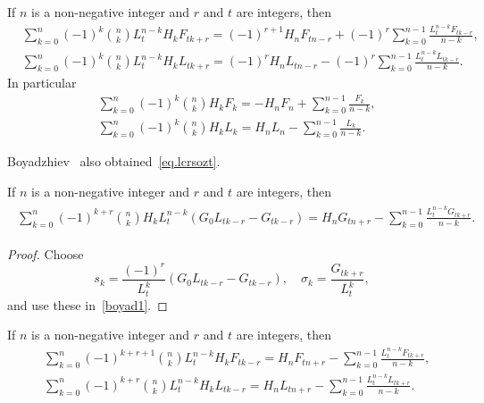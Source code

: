 \documentclass[12pt,reqno]{article}
\begin{document}
\begin{corollary}
If $n$ is a non-negative integer and $r$ and $t$ are integers, then
\begin{align}
&\sum_{k = 0}^n ( - 1)^k \binom{{n}}{k}L_t^{n - k} H_k F_{tk + r} = ( - 1)^{r + 1} H_n F_{tn - r} + ( - 1)^r \sum_{k = 0}^{n - 1} {\frac{{L_t^{n - k} F_{tk - r} }}{{n - k}}} ,\\
&\sum_{k = 0}^n ( - 1)^k \binom{{n}}{k}L_t^{n - k} H_k L_{tk + r} = ( - 1)^r H_n L_{tn - r} - ( - 1)^r \sum_{k = 0}^{n - 1} {\frac{{L_t^{n - k} L_{tk - r} }}{{n - k}}}.
\end{align}
In particular
\begin{align}
&\sum_{k = 0}^n ( - 1)^k \binom{{n}}{k}H_k F_k = - H_n F_n + \sum_{k = 0}^{n - 1} {\frac{{F_k }}{{n - k}}}\label{eq.lcrsozt},\\ 
&\sum_{k = 0}^n ( - 1)^k \binom{{n}}{k}H_k L_k = H_n L_n - \sum_{k = 0}^{n - 1} {\frac{{L_k }}{{n - k}}} .
	\end{align}
	\end{corollary}

\begin{remark}
Boyadzhiev~\cite{boyadzhiev16} also obtained~\eqref{eq.lcrsozt}.
\end{remark}

\begin{theorem}
If $n$ is a non-negative integer and $r$ and $t$ are integers, then
\begin{align}
\begin{split}
\sum_{k=0}^n (-1)^{k+r} \binom{n}{k} H_k L_t^{n-k}\left(G_0L_{tk-r}-G_{tk-r}\right)
= H_n G_{tn+r} - \sum_{k=0}^{n-1} \frac{L_t^{n-k}G_{tk+r}}{n-k}.
\end{split}
\end{align}
\end{theorem}	
\begin{proof}
Choose
\begin{equation*}
s_k  =\frac{{( - 1)^r }}{{L_t^k }}\left(G_0L_{tk-r}-G_{tk-r}\right) ,\quad\sigma_k  = \frac{{G_{tk + r} }}{{L_t^k }},
\end{equation*}
and use these in~\eqref{boyad1}.
\end{proof}	

\begin{corollary}
If $n$ is a non-negative integer and $r$ and $t$ are integers, then
\begin{align}
&\sum_{k=0}^n (-1)^{k+r+1} \binom{n}{k} L_t^{n-k} H_k F_{tk-r} = H_n F_{tn+r} - \sum_{k=0}^{n-1} \frac{L_t^{n-k}F_{tk+r}}{n-k}, \\
&\sum_{k=0}^n (-1)^{k+r} \binom{n}{k} L_t^{n-k} H_k L_{tk-r} = H_n L_{tn+r} - \sum_{k=0}^{n-1} \frac{L_t^{n-k}L_{tk+r}}{n-k}.
\end{align}
\end{corollary}
\end{document}
